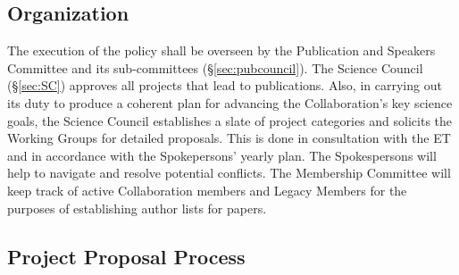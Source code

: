 \documentclass[12pt]{article}
\newcommand{\Comment}[1]{\textcolor{Blue}{(Comment: #1)}}
\begin{document}
\subsection{Organization}
The execution of the policy shall be overseen by the Publication and Speakers Committee and its sub-committees (\S\ref{sec:pubcouncil}). 
{\color{red} The Science Council (\S\ref{sec:SC}) approves all projects that lead to publications.
Also, in carrying out its duty to produce a coherent plan for advancing the Collaboration's key science goals, the Science Council establishes a slate of project categories and solicits the Working Groups for detailed proposals. %
This is done in consultation with the ET and in accordance with the Spokepersons' yearly plan.}
The Spokespersons will help to navigate and resolve potential conflicts.
The Membership Committee will keep track of active Collaboration members and Legacy Members for the purposes of establishing author lists for papers.


\subsection{Project Proposal Process}
\label{sec:pubprop}

\end{document}
